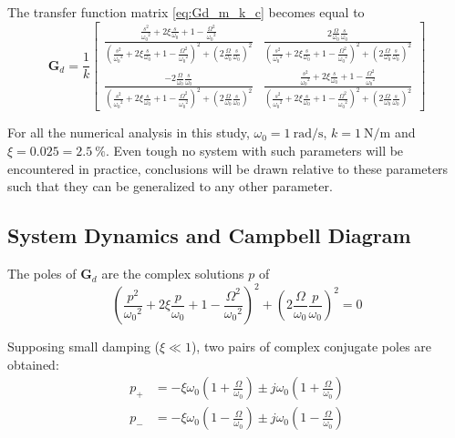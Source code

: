 \documentclass{ISMA_USD2020}
\begin{document}
The transfer function matrix \eqref{eq:Gd_m_k_c} becomes equal to
\begin{equation}
\label{eq:Gd_w0_xi_k}
\bm{G}_{d} =
  \frac{1}{k}
  \begin{bmatrix}
    \frac{\frac{s^2}{{\omega_0}^2} + 2 \xi \frac{s}{\omega_0} + 1 - \frac{{\Omega}^2}{{\omega_0}^2}}{\left( \frac{s^2}{{\omega_0}^2} + 2 \xi \frac{s}{\omega_0} + 1 - \frac{{\Omega}^2}{{\omega_0}^2} \right)^2 + \left( 2 \frac{\Omega}{\omega_0} \frac{s}{\omega_0} \right)^2} & \frac{2 \frac{\Omega}{\omega_0} \frac{s}{\omega_0}}{\left( \frac{s^2}{{\omega_0}^2} + 2 \xi \frac{s}{\omega_0} + 1 - \frac{{\Omega}^2}{{\omega_0}^2} \right)^2 + \left( 2 \frac{\Omega}{\omega_0} \frac{s}{\omega_0} \right)^2} \\
    \frac{- 2 \frac{\Omega}{\omega_0} \frac{s}{\omega_0}}{\left( \frac{s^2}{{\omega_0}^2} + 2 \xi \frac{s}{\omega_0} + 1 - \frac{{\Omega}^2}{{\omega_0}^2} \right)^2 + \left( 2 \frac{\Omega}{\omega_0} \frac{s}{\omega_0} \right)^2} & \frac{\frac{s^2}{{\omega_0}^2} + 2 \xi \frac{s}{\omega_0} + 1 - \frac{{\Omega}^2}{{\omega_0}^2}}{\left( \frac{s^2}{{\omega_0}^2} + 2 \xi \frac{s}{\omega_0} + 1 - \frac{{\Omega}^2}{{\omega_0}^2} \right)^2 + \left( 2 \frac{\Omega}{\omega_0} \frac{s}{\omega_0} \right)^2}
  \end{bmatrix}
\end{equation}

For all the numerical analysis in this study, \(\omega_0 = \SI{1}{\radian\per\second}\), \(k = \SI{1}{\newton\per\meter}\) and \(\xi = 0.025 = \SI{2.5}{\percent}\).
Even tough no system with such parameters will be encountered in practice, conclusions will be drawn relative to these parameters such that they can be generalized to any other parameter.

\subsection{System Dynamics and Campbell Diagram}
\label{sec:orga228a88}
The poles of \(\bm{G}_d\) are the complex solutions \(p\) of
\begin{equation}
  \left( \frac{p^2}{{\omega_0}^2} + 2 \xi \frac{p}{\omega_0} + 1 - \frac{{\Omega}^2}{{\omega_0}^2} \right)^2 + \left( 2 \frac{\Omega}{\omega_0} \frac{p}{\omega_0} \right)^2 = 0
\end{equation}

Supposing small damping (\(\xi \ll 1\)), two pairs of complex conjugate poles are obtained:
\begin{subequations}
\label{eq:pole_values}
  \begin{align}
    p_{+} &= - \xi \omega_0 \left( 1 + \frac{\Omega}{\omega_0} \right) \pm j \omega_0 \left( 1 + \frac{\Omega}{\omega_0} \right) \\
    p_{-} &= - \xi \omega_0 \left( 1 - \frac{\Omega}{\omega_0} \right) \pm j \omega_0 \left( 1 - \frac{\Omega}{\omega_0} \right)
  \end{align}
\end{subequations}
\end{document}
